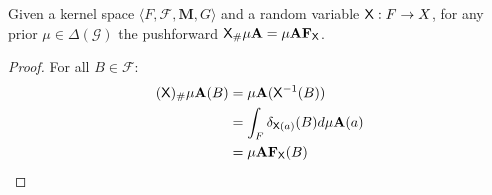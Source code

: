 \begin{lemma}
Given a kernel space $\langle F,\mathcal{F},\mathbf{M}, G\rangle$ and a random variable $\mathsf{X}:F\to X$, for any prior $\mu\in \Delta(\mathcal{G})$ the pushforward $\mathsf{X}_\# \mu \mathbf{A} = \mu\mathbf{A} \mathbf{F}_{\mathsf{X}}$.
\end{lemma}

\begin{proof}
For all $B\in \mathcal{F}$:
\begin{align}
  (\mathsf{X})_\# \mu \mathbf{A} (B) &= \mu \mathbf{A} (\mathsf{X}^{-1}(B))\\
  								   &= \int_{F} \delta_{\mathsf{X}(a)} (B) d\mu\mathbf{A} (a)\\
  								   &= \mu\mathbf{A}\mathbf{F}_{\mathsf{X}}(B)
\end{align}
\end{proof}

